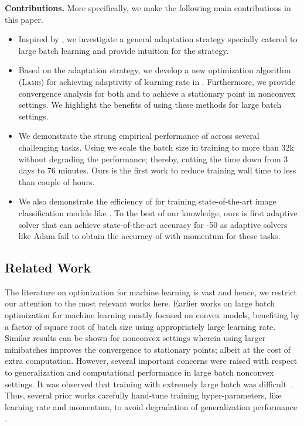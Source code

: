 \documentclass{article} \usepackage{iclr2020_conference,times}
\newcommand{\lamb}{\textsc{Lamb}}
\begin{document}
{\bf Contributions.} More specifically, we make the following main contributions in this paper.

\begin{itemize}
\item Inspired by , we investigate a general adaptation strategy specially catered to large batch learning and provide intuition for the strategy.
\item Based on the adaptation strategy, we develop a new optimization algorithm (\lamb) for achieving adaptivity of learning rate in . Furthermore, we provide convergence analysis for both  and  to achieve a stationary point in nonconvex settings. We highlight the benefits of using these methods for large batch settings.
\item We demonstrate the strong empirical performance of  across several challenging tasks. Using  we scale the batch size in training  to more than 32k without degrading the performance; thereby, cutting the time down from 3 days to 76 minutes. Ours is the first work to reduce  training wall time to less than couple of hours.
\item We also demonstrate the efficiency of  for training state-of-the-art image classification models like . To the best of our knowledge, ours is first adaptive solver that can achieve state-of-the-art accuracy for -50 as adaptive solvers like Adam fail to obtain the accuracy of  with momentum for these tasks.
\end{itemize}

\subsection{Related Work}

The literature on optimization for machine learning is vast and hence, we restrict our attention to the most relevant works here. Earlier works on large batch optimization for machine learning mostly focused on convex models, benefiting by a factor of square root of batch size using appropriately large learning rate. Similar results can be shown for nonconvex settings wherein using larger minibatches improves the convergence to stationary points; albeit at the cost of extra computation. However, several important concerns were raised with respect to generalization and computational performance in large batch nonconvex settings. It was observed that training with extremely large batch was difficult~\citep{keskar2016large, hoffer2017train}. Thus, several prior works carefully hand-tune training hyper-parameters, like learning rate and momentum, to avoid degradation of generalization performance \citep{goyal2017accurate, li2017scaling, you2018imagenet, shallue2018measuring}. 
\end{document}
